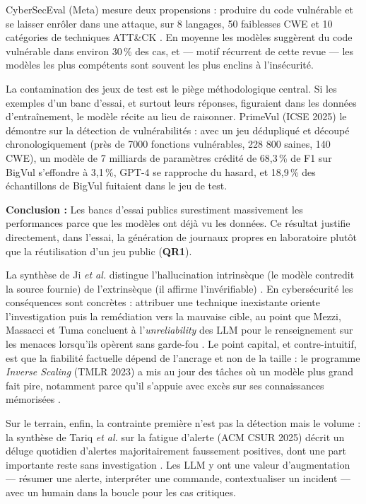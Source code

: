 
CyberSecEval (Meta) mesure deux propensions : produire du code vulnérable et se laisser enrôler dans une attaque, sur 8 langages, 50 faiblesses CWE et 10 catégories de techniques ATT\&CK \cite{cyberseceval}. En moyenne les modèles suggèrent du code vulnérable dans environ 30\,\% des cas, et --- motif récurrent de cette revue --- les modèles les plus compétents sont souvent les plus enclins à l'insécurité.

La contamination des jeux de test est le piège méthodologique central. Si les exemples d'un banc d'essai, et surtout leurs réponses, figuraient dans les données d'entraînement, le modèle récite au lieu de raisonner. PrimeVul (ICSE 2025) le démontre sur la détection de vulnérabilités \cite{primevul} : avec un jeu dédupliqué et découpé chronologiquement (près de 7000 fonctions vulnérables, 228 800 saines, 140 CWE), un modèle de 7 milliards de paramètres crédité de 68,3\,\% de F1 sur BigVul s'effondre à 3,1\,\%, GPT-4 se rapproche du hasard, et 18,9\,\% des échantillons de BigVul fuitaient dans le jeu de test.

\begin{encadre}
\textbf{Conclusion :} Les bancs d'essai publics surestiment massivement les performances parce que les modèles ont déjà vu les données. Ce résultat justifie directement, dans l'essai, la génération de journaux propres en laboratoire plutôt que la réutilisation d'un jeu public (\textbf{QR1}).
\end{encadre}


La synthèse de Ji \emph{et al.} distingue l'hallucination intrinsèque (le modèle contredit la source fournie) de l'extrinsèque (il affirme l'invérifiable) \cite{ji}. En cybersécurité les conséquences sont concrètes : attribuer une technique inexistante oriente l'investigation puis la remédiation vers la mauvaise cible, au point que Mezzi, Massacci et Tuma concluent à l'\emph{unreliability} des LLM pour le renseignement sur les menaces lorsqu'ils opèrent sans garde-fou \cite{mezzi}. Le point capital, et contre-intuitif, est que la fiabilité factuelle dépend de l'ancrage et non de la taille : le programme \emph{Inverse Scaling} (TMLR 2023) a mis au jour des tâches où un modèle plus grand fait pire, notamment parce qu'il s'appuie avec excès sur ses connaissances mémorisées \cite{inversescaling}.

Sur le terrain, enfin, la contrainte première n'est pas la détection mais le volume : la synthèse de Tariq \emph{et al.} sur la fatigue d'alerte (ACM CSUR 2025) décrit un déluge quotidien d'alertes majoritairement faussement positives, dont une part importante reste sans investigation \cite{tariq}. Les LLM y ont une valeur d'augmentation --- résumer une alerte, interpréter une commande, contextualiser un incident --- avec un humain dans la boucle pour les cas critiques.

